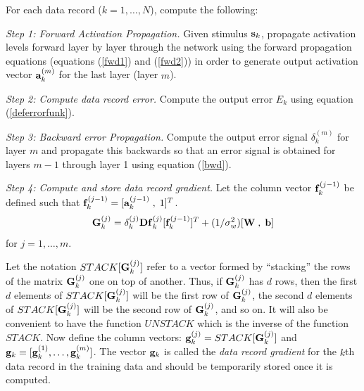 \documentclass{report}
\begin{document}
For each data record ($k = 1, \ldots, N$), compute the following:
\begin{itemize}
\begin{item}
{\em Step 1: Forward Activation Propagation.} Given stimulus ${\bf
s}_k$, propagate activation levels forward layer by layer through the
network using the forward propagation equations (equations
(\ref{fwd1}) and (\ref{fwd2})) in order to generate output activation
vector ${\bf a}^{(m)}_k$ for the last layer (layer $m$).
\end{item}
\begin{item}
{\em Step 2: Compute data record error.}  Compute the output error
$E_k$ using equation (\ref{deferrorfunk}).
\end{item}
\begin{item}
{\em Step 3: Backward error Propagation.} Compute the output error
signal $\delta^{(m)}_k$ for layer $m$ and propagate this backwards so
that an error signal is obtained for layers $m-1$ through layer 1
using equation (\ref{bwd}).
\end{item}
\begin{item}
{\em Step 4: Compute and store data record gradient.}
Let the column vector ${\bf f}^{(j-1)}_k$ be defined such that
${\bf f}^{(j-1)}_k = [{\bf a}^{(j-1)}_k \;,\; 1]^T$.
\begin{equation}\label{gradcalc}
{\bf G}^{(j)}_k = \delta^{(j)}_k  {\bf Df}^{(j)}_k
[{\bf f}^{(j-1)}_k]^T + (1/\sigma_w^2)[{\bf W} \;,\; {\bf b}]
\end{equation}
for $j = 1, \ldots, m$.

Let the notation $STACK[{\bf G}^{(j)}_k]$ refer to a vector formed by
``stacking'' the rows of the matrix ${\bf G}^{(j)}_k$ one on top of
another.  Thus, if ${\bf G}^{(j)}_k$ has $d$ rows, then the first $d$
elements of $STACK[{\bf G}^{(j)}_k]$ will be the first row of ${\bf
G}^{(j)}_k$, the second $d$ elements of $STACK[{\bf G}^{(j)}_k]$ will
be the second row of ${\bf G}^{(j)}_k$, and so on.  It will also be
convenient to have the function $UNSTACK$ which is the inverse of the
function $STACK$.  Now define the column vectors:
${\bf g}^{(j)}_k = STACK[{\bf G}^{(j)}_k]$ and
${\bf g}_k = [{\bf g}^{(1)}_k, \ldots, {\bf g}^{(m)}_k]$.
The vector ${\bf g}_k$ is called the {\em data record gradient}
for the $k$th data record in the training data and should be
temporarily stored once it is computed.
\end{item}
\end{itemize}
\end{document}
